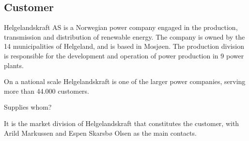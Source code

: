 \subsection{Customer}
Helgelandskraft AS is a Norwegian power company engaged in the production,
transmission and distribution of renewable energy. The company is owned by
the 14 municipalities of Helgeland, and is based in Mosjøen. The production
division is responsible for the development and operation of power production
in 9 power plants.

On a national scale Helgelandskraft is one of the larger power companies,
serving more than 44.000 customers.

Supplies whom?

It is the market division of Helgelandskraft that constitutes the customer,
with Arild Markussen and Espen Skarsbø Olsen as the main contacts.
